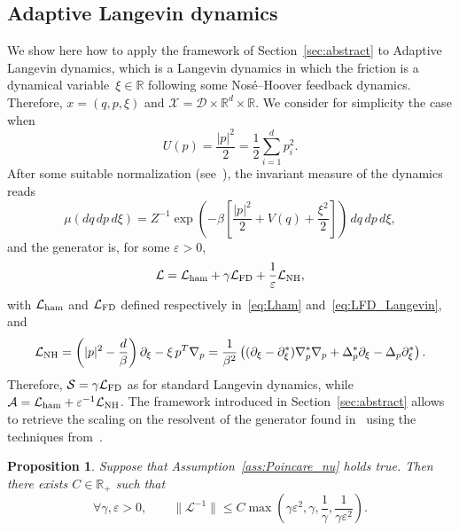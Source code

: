 \documentclass{article}
\newtheorem{prop}{Proposition}
\newcommand{\cL}{\mathcal{L}}
\newcommand{\cLs}{\mathcal{S}}
\newcommand{\cLa}{\mathcal{A}}
\newcommand{\cLham}{\mathcal{L}_{\rm ham}}
\newcommand{\cLFD}{\mathcal{L}_{\rm FD}}
\newcommand{\cX}{\mathcal{X}}
\newcommand{\cD}{\mathcal{D}}
\renewcommand{\leq}{\leqslant}
\begin{document}
\subsection{Adaptive Langevin dynamics}
\label{sec:AdL}

We show here how to apply the framework of Section~\ref{sec:abstract} to Adaptive Langevin dynamics, which is a Langevin dynamics in which the friction is a dynamical variable~$\xi \in \mathbb{R}$ following some Nos\'e--Hoover feedback dynamics. Therefore, $x = (q,p,\xi)$ and $\cX = \cD \times \mathbb{R}^d \times \mathbb{R}$. We consider for simplicity the case when
\begin{equation}
  \label{eq:quadratic_U}
  U(p) = \frac{|p|^2}{2} = \frac12 \sum_{i=1}^d p_i^2.
\end{equation}
After some suitable normalization (see~\cite{LSS19}), the invariant measure of the dynamics reads
\[
\mu(dq \, dp \, d\xi) = Z^{-1} \exp\left(-\beta \left [\frac{|p|^2}{2} + V(q) + \frac{\xi^2}{2} \right]\right) \, dq \, dp \, d\xi,
\]
and the generator is, for some $\varepsilon > 0$,
\newcommand{\cLNH}{\cL_{\rm NH}}
\[
  \cL = \cLham + \gamma \cLFD + \frac{1}{\varepsilon} \cLNH,
\]
with $\cLham$ and $\cLFD$ defined respectively in~\eqref{eq:Lham} and~\eqref{eq:LFD_Langevin}, and 
\[
  \cLNH = \left (|p|^{2} - \frac{d}{\beta} \right ) \partial_{\xi} - \xi\, p^T \nabla_{p} = \frac{1}{\beta^2} \left((\partial_\xi-\partial_\xi^*)\nabla_p^*\nabla_p + \Delta_p^*\partial_\xi - \Delta_p\partial_\xi^* \right).
\]
Therefore, $\cLs = \gamma \cLFD$ as for standard Langevin dynamics, while $\cLa = \cLham + \varepsilon^{-1} \cLNH$. The framework introduced in Section~\ref{sec:abstract} allows to retrieve the scaling on the resolvent of the generator found in~\cite{LSS19} using the techniques from~\cite{Herau06,DMS15}.

\begin{prop}
  Suppose that Assumption~\ref{ass:Poincare_nu} holds true. Then there exists $C \in \mathbb{R}_+$ such that
  \[
    \forall \gamma,\varepsilon>0, \qquad \|\cL^{-1}\| \leq C\max\left(\gamma\varepsilon^2,\gamma,\frac1\gamma,\frac{1}{\gamma\varepsilon^2}\right).
\]
\end{prop}
\end{document}
